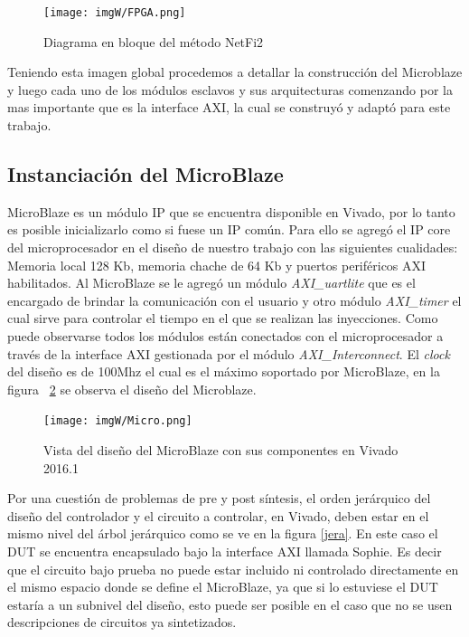 \documentclass[a4paper,openright,12pt]{report}
\begin{document}
\begin{figure}[H]
	\centering
	\texttt{[image: imgW/FPGA.png]}
	\caption{Diagrama en bloque del método NetFi2}
	\label{FPGAs}
\end{figure}

Teniendo esta imagen global procedemos a detallar la construcción del Microblaze y luego cada uno de los módulos esclavos  y sus arquitecturas comenzando por la mas importante que es la interface AXI, la cual se construyó y adaptó para este trabajo.
 
 
\subsection{Instanciación del MicroBlaze}

MicroBlaze es un módulo IP que se encuentra disponible en Vivado, por lo tanto es posible inicializarlo como si fuese un IP común. Para ello se agregó el IP core del microprocesador en el diseño de nuestro trabajo con las siguientes cualidades: Memoria local 128 Kb, memoria chache de 64 Kb y puertos periféricos AXI habilitados.
Al MicroBlaze se le agregó un módulo \textit{AXI\_uartlite} que es el encargado de brindar la comunicación con el usuario y otro módulo \textit{AXI\_timer} el cual sirve para controlar el tiempo en el que se realizan las inyecciones. Como puede observarse todos los módulos están conectados con el microprocesador a través de la interface AXI gestionada por el módulo  \textit{AXI\_Interconnect}. El \textit{clock} del diseño es de 100Mhz el cual es el máximo soportado por MicroBlaze, en la figura ~\ref{Micro} se observa el diseño del Microblaze.



\begin{figure}[H]
	\centering
	\texttt{[image: imgW/Micro.png]}
	\caption{Vista del diseño del MicroBlaze con sus componentes en Vivado 2016.1}
	\label{Micro}
\end{figure}

Por una cuestión de problemas de pre y post síntesis, el orden jerárquico  del diseño  del controlador y el circuito a controlar, en Vivado, deben estar en el mismo nivel del árbol jerárquico  como se ve en la figura \ref{jera}. En este caso el DUT se encuentra encapsulado bajo la interface AXI llamada Sophie. Es decir que el circuito bajo prueba no puede estar incluido ni controlado directamente en el mismo espacio donde se define el MicroBlaze, ya que si lo estuviese el DUT estaría a un subnivel del diseño, esto puede ser posible en el caso que no se usen descripciones de circuitos ya sintetizados.  
\end{document}
